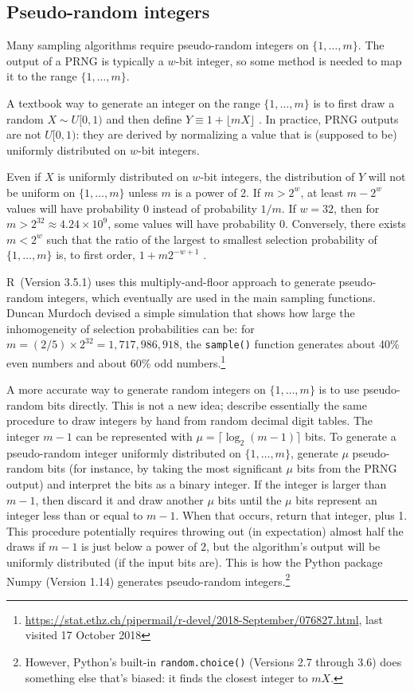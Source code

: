 \documentclass[graybox]{svmult}
\begin{document}
\subsection{Pseudo-random integers}
\label{sec:integers}
Many sampling algorithms require pseudo-random integers on $\{1, \ldots, m\}$.
The output of a PRNG is typically a $w$-bit integer, so some method is needed to map it to the range $\{1, \ldots, m\}$.

A textbook way to generate an integer on the range $\{1, \ldots, m\}$ is to first draw a random $X \sim U[0,1)$
and then define $Y \equiv 1 + \lfloor mX \rfloor$ \cite{press_numerical_1988, peck_introduction_2011}. 
In practice, PRNG outputs are not $U[0,1)$: they are derived by normalizing a value that is
 (supposed to be) uniformly distributed on $w$-bit integers. 

Even if $X$ is uniformly distributed on $w$-bit integers, the distribution of $Y$ will not be uniform on $\{1, \ldots, m\}$ unless $m$ is a power of 2.
If $m > 2^w$, at least $m-2^w$ values will have probability 0 instead of probability $1/m$.
If $w=32$, then for $m>2^{32}\approx4.24 \times 10^9$, some values will have probability 0. 
Conversely, there exists $m < 2^w$ such that the ratio of the largest to smallest selection probability
of $\{1, \ldots, m\}$ is, to first order,  $1+ m 2^{-w+1}$ \cite{knuth_art_1997}.

R~(Version 3.5.1) \cite{R_2018} uses this multiply-and-floor approach to generate 
pseudo-random integers,
which eventually are used in the main sampling functions.
Duncan Murdoch devised a simple simulation that shows how large the inhomogeneity of selection
probabilities can be:
for $m=  (2/5) \times 2^{32} = 1,717,986,918$, the \texttt{sample()} function generates about 40\% even numbers and about 60\% odd numbers.\footnote{ %
\url{https://stat.ethz.ch/pipermail/r-devel/2018-September/076827.html}, last visited 17 October 2018
}
    
A more accurate way to generate random integers on $\{1, \dots, m\}$ is to use pseudo-random bits directly. 
This is not a new idea; \cite{hodges_basic_1970} describe essentially the same procedure to draw integers by 
hand from random decimal digit tables.
The integer $m-1$ can be represented with $\mu = \lceil \log_2(m-1) \rceil$ bits. 
To generate a pseudo-random integer uniformly distributed on $\{1, \ldots, m\}$, 
generate $\mu$ pseudo-random bits (for instance, by taking the most significant $\mu$ bits from the PRNG output) and interpret the bits as a binary integer.  
If the integer is larger than $m-1$, then discard it and draw another $\mu$ bits until the $\mu$ bits represent an integer less than or equal to $m-1$.
When that occurs, return that integer, plus 1.
This procedure potentially requires throwing out (in expectation) almost half the draws if $m-1$ is 
just below a power of $2$, but the algorithm's output will be uniformly distributed (if the input bits are).
This is how the Python package Numpy (Version 1.14) generates pseudo-random integers.\footnote{
However, Python's built-in \texttt{random.choice()} (Versions 2.7 through 3.6) does something else that's biased: it finds the closest integer to $mX$.
}
\end{document}
